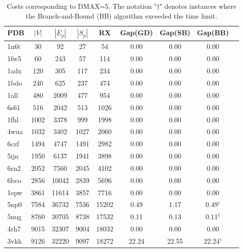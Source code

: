 \begin{table}
\caption{Costs corresponding to DMAX=5. The notation "$\dag$" denotes instances where the Branch-and-Bound (BB) algorithm exceeded the time limit.}
\label{tab:cost_5}
\begin{tabular}{lcccccccc}
\toprule
PDB & $|V|$ & $|E_p|$ & $|S_p|$ & RX & Gap(GD) & Gap(SB) & Gap(BB) \\
\midrule
1n6t & 30 & 92 & 27 & 54 & 0.00 & 0.00 & 0.00 \\
1fw5 & 60 & 243 & 57 & 114 & 0.00 & 0.00 & 0.00 \\
1adx & 120 & 305 & 117 & 234 & 0.00 & 0.00 & 0.00 \\
1bdo & 240 & 625 & 237 & 474 & 0.00 & 0.00 & 0.00 \\
1all & 480 & 2009 & 477 & 954 & 0.00 & 0.00 & 0.00 \\
6s61 & 516 & 2042 & 513 & 1026 & 0.00 & 0.00 & 0.00 \\
1fhl & 1002 & 3378 & 999 & 1998 & 0.00 & 0.00 & 0.00 \\
4wua & 1032 & 3402 & 1027 & 2060 & 0.00 & 0.00 & 0.00 \\
6czf & 1494 & 4747 & 1491 & 2982 & 0.00 & 0.00 & 0.00 \\
5ijn & 1950 & 6137 & 1941 & 3898 & 0.00 & 0.00 & 0.00 \\
6rn2 & 2052 & 7560 & 2045 & 4102 & 0.00 & 0.00 & 0.00 \\
6bco & 2856 & 10042 & 2839 & 5696 & 0.00 & 0.00 & 0.00 \\
1epw & 3861 & 11614 & 3857 & 7716 & 0.00 & 0.00 & 0.00 \\
5np0 & 7584 & 36732 & 7536 & 15202 & 0.49 & 1.17 & 0.49$^\dag$ \\
5nug & 8760 & 30705 & 8738 & 17532 & 0.11 & 0.13 & 0.11$^\dag$ \\
4rh7 & 9015 & 32307 & 9004 & 18032 & 0.00 & 0.00 & 0.00 \\
3vkh & 9126 & 32220 & 9097 & 18272 & 22.24 & 22.55 & 22.24$^\dag$ \\
\bottomrule
\end{tabular}
\end{table}
